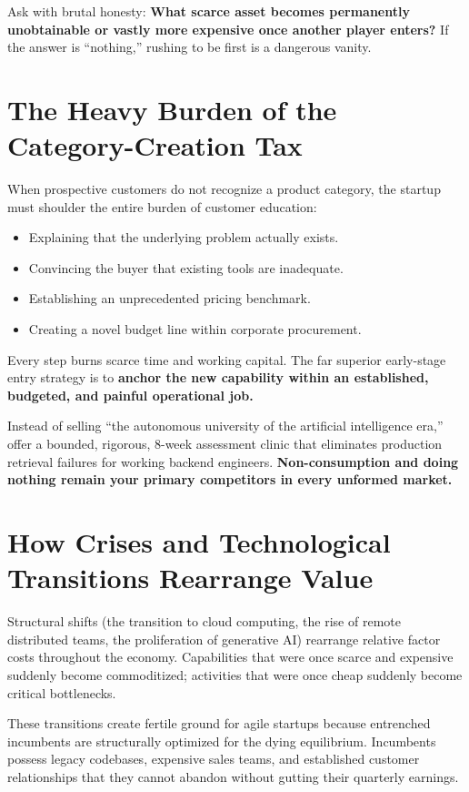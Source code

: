 Ask with brutal honesty: \textbf{What scarce asset becomes permanently unobtainable or vastly more expensive once another player enters?} If the answer is ``nothing,'' rushing to be first is a dangerous vanity.

\section{The Heavy Burden of the Category-Creation Tax}

When prospective customers do not recognize a product category, the startup must shoulder the entire burden of customer education:
\begin{itemize}[leftmargin=12pt,itemsep=1pt,topsep=1pt]
  \item Explaining that the underlying problem actually exists.
  \item Convincing the buyer that existing tools are inadequate.
  \item Establishing an unprecedented pricing benchmark.
  \item Creating a novel budget line within corporate procurement.
\end{itemize}

Every step burns scarce time and working capital. The far superior early-stage entry strategy is to \textbf{anchor the new capability within an established, budgeted, and painful operational job.}

Instead of selling ``the autonomous university of the artificial intelligence era,'' offer a bounded, rigorous, 8-week assessment clinic that eliminates production retrieval failures for working backend engineers. \textbf{Non-consumption and doing nothing remain your primary competitors in every unformed market.}

\section{How Crises and Technological Transitions Rearrange Value}

Structural shifts (the transition to cloud computing, the rise of remote distributed teams, the proliferation of generative AI) rearrange relative factor costs throughout the economy. Capabilities that were once scarce and expensive suddenly become commoditized; activities that were once cheap suddenly become critical bottlenecks.

These transitions create fertile ground for agile startups because entrenched incumbents are structurally optimized for the dying equilibrium. Incumbents possess legacy codebases, expensive sales teams, and established customer relationships that they cannot abandon without gutting their quarterly earnings.

